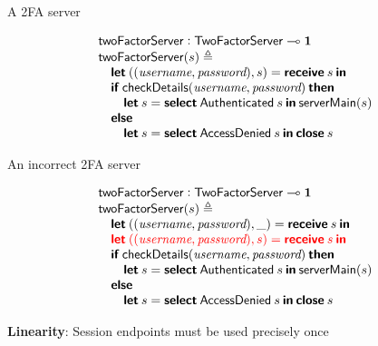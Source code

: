 \documentclass[11.5pt, aspectratio=169]{beamer}
\begin{document}
\begin{frame}{A 2FA server}

{\large
\[
  \begin{array}{l}
  \mathsf{twoFactorServer} : \mathsf{TwoFactorServer} \multimap \mathbf{1} \\
  \mathsf{twoFactorServer}(s) \triangleq \\
  \quad \textbf{\textsf{let}} \: ((\textit{username}, \textit{password}), s) = \textbf{\textsf{receive}} \: s \: \textbf{\textsf{in}} \\
  \quad \textbf{\textsf{if}} \: \mathsf{checkDetails}(\textit{username},
  \textit{password})\: \textbf{\textsf{then}} \\
  \qquad \textbf{\textsf{let}} \: s = \textbf{\textsf{select}} \: \mathsf{Authenticated} \: s \: \textbf{\textsf{in}} \: \mathsf{serverMain}(s) \\
  \quad \textbf{\textsf{else}} \\
  \qquad \textbf{\textsf{let}} \: s = \textbf{\textsf{select}} \: \mathsf{AccessDenied} \: s \: \textbf{\textsf{in}} \: \textbf{\textsf{close}} \: s \\
  \end{array}
\]
}
\end{frame}

\begin{frame}{An incorrect 2FA server}

{\large
\[
  \begin{array}{l}
  \mathsf{twoFactorServer} : \mathsf{TwoFactorServer} \multimap \mathbf{1} \\
  \mathsf{twoFactorServer}(s) \triangleq \\
  \quad \textbf{\textsf{let}} \: ((\textit{username}, \textit{password}), \_) = \textbf{\textsf{receive}} \: s \: \textbf{\textsf{in}} \\
  \quad {\color{red}{\textbf{\textsf{let}} \: ((\textit{username}, \textit{password}), s) = \textbf{\textsf{receive}} \:s \: \textbf{\textsf{in}}}} \\
  \quad \textbf{\textsf{if}} \: \mathsf{checkDetails}(\textit{username},
  \textit{password})\: \textbf{\textsf{then}} \\
  \qquad \textbf{\textsf{let}} \: s = \textbf{\textsf{select}} \: \mathsf{Authenticated} \: s \: \textbf{\textsf{in}} \: \mathsf{serverMain}(s) \\
  \quad \textbf{\textsf{else}} \\
  \qquad \textbf{\textsf{let}} \: s = \textbf{\textsf{select}} \: \mathsf{AccessDenied} \: s \: \textbf{\textsf{in}} \: \textbf{\textsf{close}} \: s \\
  \end{array}
\]
}

\begin{center}
  \Large
  \textbf{Linearity}: Session endpoints must be used precisely once
\end{center}
\end{frame}
\end{document}

